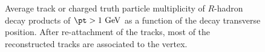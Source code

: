 \begin{figure}[tbp]
\begin{center}
\caption{Average track or charged truth particle multiplicity of $R$-hadron decay products of $\pt>1~{\rm GeV}$ as a function of the decay transverse position. After re-attachment of the tracks, most of the reconstructed tracks are associated to the vertex.}
\label{fig:reattachment_effect}
\end{center}
\end{figure}

